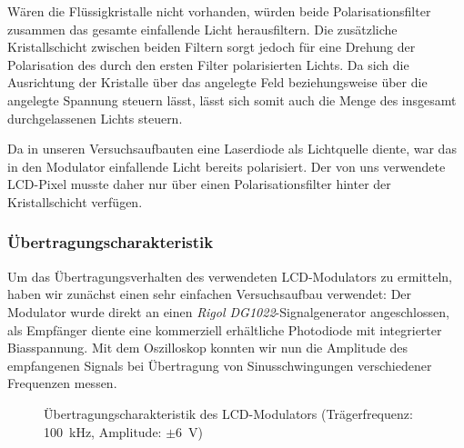 \documentclass[12pt,a4paper]{article}
\begin{document}
Wären die Flüssigkristalle nicht vorhanden, würden beide Polarisationsfilter zusammen das gesamte einfallende Licht herausfiltern. Die zusätzliche Kristallschicht zwischen beiden Filtern sorgt jedoch für eine Drehung der Polarisation des durch den ersten Filter polarisierten Lichts. Da sich die Ausrichtung der Kristalle über das angelegte Feld beziehungsweise über die angelegte Spannung steuern lässt, lässt sich somit auch die Menge des insgesamt durchgelassenen Lichts steuern.

Da in unseren Versuchsaufbauten eine Laserdiode als Lichtquelle diente, war das in den Modulator einfallende Licht bereits polarisiert. Der von uns verwendete LCD-Pixel musste daher nur über einen Polarisationsfilter hinter der Kristallschicht verfügen.

\subsubsection{Übertragungscharakteristik}
\label{sec:lcd_transfer_characteristics}

Um das Übertragungsverhalten des verwendeten LCD-Modulators zu ermitteln, haben wir zunächst einen sehr einfachen Versuchsaufbau verwendet: Der Modulator wurde direkt an einen \textit{Rigol DG1022}-Signalgenerator angeschlossen, als Empfänger diente eine kommerziell erhältliche Photodiode mit integrierter Biasspannung. Mit dem Oszilloskop konnten wir nun die Amplitude des empfangenen Signals bei Übertragung von Sinusschwingungen verschiedener Frequenzen messen.

\begin{figure}[H]
  \centering
  \caption{Übertragungscharakteristik des LCD-Modulators (Trägerfrequenz: \SI{100}{\kilo\hertz}, Amplitude: $\pm$\SI{6}{\volt})}
  \label{fig:lcd_transfer_function}
\end{figure}
\end{document}
